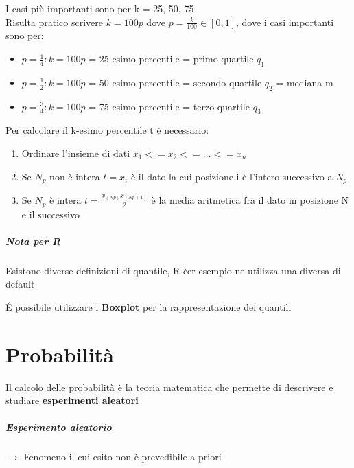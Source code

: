 \documentclass[12pt, a4paper, openany]{book}
\begin{document}
I casi più importanti sono per k = 25, 50, 75
\\ Risulta pratico scrivere $k = 100p$ dove $p = \frac{k}{100}\in [0, 1]$, dove i casi importanti sono per:
\begin{itemize} 
    \item $p = \frac{1}{4}: k = 100p$ = 25-esimo percentile = primo quartile $q_1$
    \item $p = \frac{1}{2}: k = 100p$ = 50-esimo percentile = secondo quartile $q_2$ = mediana m
    \item $p = \frac{3}{4}: k = 100p$ = 75-esimo percentile = terzo quartile $q_3$
\end{itemize}

Per calcolare il k-esimo percentile t è necessario:
\begin{enumerate}
    \item Ordinare l'insieme di dati $x_1 <= x_2 <= \dots <= x_n$
    \item Se $N_p$ non è intera $t=x_i$ è il dato la cui posizione i è l'intero successivo a $N_p$
    \item Se $N_p$ è intera $t = \frac{x_(Np) x_(Np+1)}{2}$ è la media aritmetica fra il dato in posizione N e il successivo 
\end{enumerate}

\paragraph{Nota per R} Esistono diverse definizioni di quantile, R èer esempio ne utilizza una diversa di default

\'E possibile utilizzare i \textbf{Boxplot} per la rappresentazione dei quantili

\chapter{Probabilità}
Il calcolo delle probabilità è la teoria matematica che permette di descrivere e studiare \textbf{esperimenti aleatori}
\paragraph{Esperimento aleatorio} $\to$ Fenomeno il cui esito non è prevedibile a priori
\section{}
\end{document}
